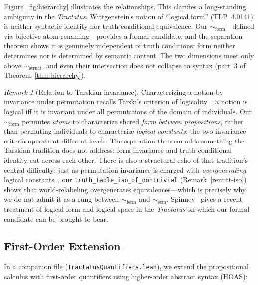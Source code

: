 \documentclass[jsl,bibother]{asl}
\theoremstyle{definition}
\theoremstyle{remark}
\newtheorem{remark}[theorem]{Remark}
\newcommand{\structEq}{\sim_{\mathrm{struct}}}
\newcommand{\formEq}{\sim_{\mathrm{form}}}
\newcommand{\semEq}{\sim_{\mathrm{sem}}}
\begin{document}
\noindent
Figure~\ref{fig:hierarchy} illustrates the relationships.  This
clarifies a long-standing ambiguity in the
\emph{Tractatus}.  Wittgenstein's notion of ``logical form''
(TLP~4.0141) is neither syntactic identity nor truth-conditional
equivalence.  Our $\formEq$---defined via bijective atom
renaming---provides a formal candidate, and the separation
theorem shows it is genuinely independent of truth conditions:
form neither determines nor is determined by semantic content.
The two dimensions meet only above $\structEq$, and even their
intersection does not collapse to syntax
(part~3 of Theorem~\ref{thm:hierarchy}).

\begin{remark}[Relation to Tarskian invariance]
\label{rem:tarski}
Characterizing a notion by invariance under permutation recalls
Tarski's criterion of logicality~\cite{tarski1986}: a notion is
logical iff it is invariant under all permutations of the domain
of individuals.  Our $\formEq$ permutes \emph{atoms} to
characterize shared \emph{form between propositions}, rather
than permuting individuals to characterize \emph{logical
constants}; the two invariance criteria operate at different
levels.  The separation theorem adds something the Tarskian
tradition does not address: form-invariance and
truth-conditional identity cut across each other.  There is also
a structural echo of that tradition's central difficulty: just
as permutation invariance is charged with \emph{overgenerating}
logical constants~\cite{sher1991,bonnay2008}, our
\texttt{truth\_table\_iso\_of\_nontrivial}
(Remark~\ref{rem:tt-iso}) shows that world-relabeling
overgenerates equivalences---which is precisely why we do not
admit it as a rung between $\formEq$ and $\semEq$.
Spinney~\cite{spinney2022} gives a recent treatment of logical
form and logical space in the \emph{Tractatus} on which our
formal candidate can be brought to bear.
\end{remark}

\subsection{First-Order Extension}
\label{sec:firstorder}

In a companion file
(\texttt{Tractatus\allowbreak Quantifiers.\allowbreak lean}), we
extend the propositional calculus with first-order quantifiers
using higher-order abstract syntax (HOAS):
\end{document}
